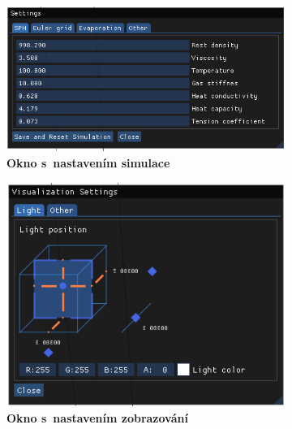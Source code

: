 \begin{figure}[h]
	\centering
	\captionsetup{justification=centering}
	\begin{subfigure}[t]{.49\textwidth}
		\centering
		\includegraphics[scale=1]{obrazky-figures/SimSett.jpg}
		\caption{\textbf{Okno s~nastavením simulace}}
		\label{fig:simSett}
	\end{subfigure}
		\begin{subfigure}[t]{.49\textwidth}
		\centering
		\includegraphics[scale=1]{obrazky-figures/VisualSettings.jpg}
		\caption{\textbf{Okno s~nastavením zobrazování}}
		\label{fig:VisSett}
	\end{subfigure}
		\begin{subfigure}[t]{1\textwidth}
			\centering

\end{subfigure}
\end{figure}
